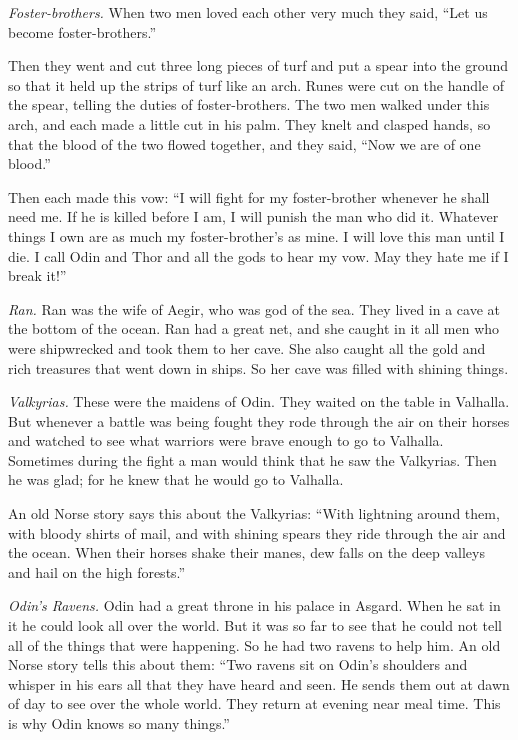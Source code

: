 \label{foster-brothers}
\noindent\emph{Foster-brothers.} When two men loved each other very much
they said, ``Let us become foster-brothers.''

Then they went and cut three long pieces of turf and put a spear into
the ground so that it held up the strips of turf like an arch. Runes
were cut on the handle of the spear, telling the duties of
foster-brothers. The two men walked under this arch, and each made a
little cut in his palm. They knelt and clasped hands, so that the blood
of the two flowed together, and they said, ``Now we are of one blood.''

Then each made this vow: ``I will fight for my foster-brother whenever
he shall need me. If he is killed before I am, I will punish the man who
did it. Whatever things I own are as much my foster-brother's as mine. I
will love this man until I die. I call Odin and Thor and all the gods to
hear my vow. May they hate me if I break it!''

\label{ran}
\noindent\emph{Ran.} Ran was the wife of Aegir, who was god of the sea.
They lived in a cave at the bottom of the ocean. Ran had a great net, and
she caught in it all men who were shipwrecked and took them to her cave.
She also caught all the gold and rich treasures that went down in ships.
So her cave was filled with shining things.

\label{valkyrias}
\noindent\emph{Valkyrias.} These were the maidens of Odin. They waited
on the table in Valhalla. But whenever a battle was being fought they
rode through the air on their horses and watched to see what warriors
were brave enough to go to Valhalla. Sometimes during the fight a man
would think that he saw the Valkyrias. Then he was glad; for he knew that
he would go to Valhalla.

An old Norse story says this about the Valkyrias: ``With lightning
around them, with bloody shirts of mail, and with shining spears they
ride through the air and the ocean. When their horses shake their manes,
dew falls on the deep valleys and hail on the high forests.''

\label{odins-ravens}
\noindent\emph{Odin's Ravens.} Odin had a great throne in his palace in
Asgard. When he sat in it he could look all over the world. But it was so
far to see that he could not tell all of the things that were happening.
So he had two ravens to help him. An old Norse story tells this about
them: ``Two ravens sit on Odin's shoulders and whisper in his ears all
that they have heard and seen. He sends them out at dawn of day to see
over the whole world. They return at evening near meal time. This is why
Odin knows so many things.''

